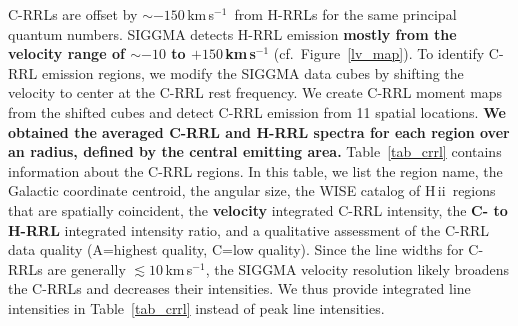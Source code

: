 \documentclass[manuscript]{aastex61}
\newcommand{\hii}{{\rm H\,}{{\sc ii}}}
\newcommand{\kms}{\,km\,s$^{-1}$}
\begin{document}
C-RRLs are offset by $\sim-150$\kms\ from H-RRLs for the same principal quantum numbers.
SIGGMA detects H-RRL emission \textbf{mostly from the velocity range of $\sim-10$ to $+150$\kms} (cf.~Figure~\ref{lv_map}).
To identify C-RRL emission regions, we modify the SIGGMA data cubes by shifting the velocity to center at the C-RRL rest frequency.
We create C-RRL moment maps from the shifted cubes and detect C-RRL emission from 11 spatial locations.
\textbf{We obtained the averaged C-RRL and H-RRL spectra for each region over an radius, defined by the central emitting area.}
Table~\ref{tab_crrl} contains information about the C-RRL regions.
In this table, we list the region name, the Galactic coordinate centroid, the angular size, the WISE catalog of \hii\ regions that are spatially coincident, the \textbf{velocity} integrated C-RRL intensity, the \textbf{C- to H-RRL} integrated intensity ratio, and a qualitative assessment of the C-RRL data quality (A=highest quality, C=low quality).
Since the line widths for C-RRLs are generally $\lesssim10$\kms, the SIGGMA velocity resolution likely broadens the C-RRLs and decreases their intensities.  We thus provide integrated line intensities in Table~\ref{tab_crrl} instead of peak line intensities.
\end{document}
